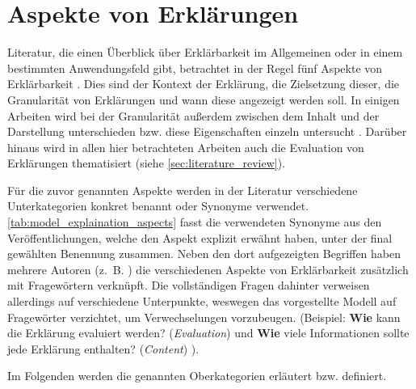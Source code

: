\section{Aspekte von Erklärungen}
\label{sec:model_explanation_aspects}

Literatur, die einen Überblick über Erklärbarkeit im Allgemeinen oder in einem bestimmten Anwendungsfeld gibt, betrachtet in der Regel fünf Aspekte von Erklärbarkeit \cite{rosenfeld_explainability_2019, nunes_systematic_2017,chazette_knowledge_nodate}. Dies sind der Kontext der Erklärung, die Zielsetzung dieser, die Granularität von Erklärungen und wann diese angezeigt werden soll. In einigen Arbeiten wird bei der Granularität außerdem zwischen dem Inhalt und der Darstellung unterschieden bzw. diese Eigenschaften einzeln untersucht \cite{nunes_systematic_2017,abdulrahman_belief-based_2019}. Darüber hinaus wird in allen hier betrachteten Arbeiten auch die Evaluation von Erklärungen thematisiert (siehe \autoref{sec:literature_review}).

Für die zuvor genannten Aspekte werden in der Literatur verschiedene Unterkategorien konkret benannt oder Synonyme verwendet. \autoref{tab:model_explaination_aspects} fasst die verwendeten Synonyme aus den Veröffentlichungen, welche den Aspekt explizit erwähnt haben, unter der final gewählten Benennung zusammen. Neben den dort aufgezeigten Begriffen haben mehrere Autoren (z.~B. \cite{rosenfeld_explainability_2019, chazette2020explainability}) die verschiedenen Aspekte von Erklärbarkeit zusätzlich mit Fragewörtern verknüpft. Die vollständigen Fragen dahinter verweisen allerdings auf verschiedene Unterpunkte, weswegen das vorgestellte Modell auf Fragewörter verzichtet, um Verwechselungen vorzubeugen. (Beispiel: \glqq \textbf{Wie} kann die Erklärung evaluiert werden?\grqq{} (\textit{Evaluation}) \cite[vgl.][]{rosenfeld_explainability_2019} und \glqq \textbf{Wie} viele Informationen sollte jede Erklärung enthalten?\grqq{} (\textit{Content}) \cite[vgl.][]{kouki_user_2017}).

\bigskip

Im Folgenden werden die genannten Oberkategorien erläutert bzw. definiert.

